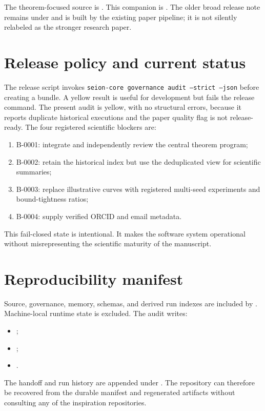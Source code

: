 \documentclass[11pt]{article}
\begin{document}
The theorem-focused source is . This companion is . The older broad release note remains under  and is built by the existing paper pipeline; it is not silently relabeled as the stronger research paper.

\section{Release policy and current status}

The release script invokes \texttt{seion-core governance audit --strict --json} before creating a bundle. A yellow result is useful for development but fails the release command. The present audit is yellow, with no structural errors, because it reports duplicate historical executions and the paper quality flag is not release-ready. The four registered scientific blockers are:
\begin{enumerate}
    \item B-0001: integrate and independently review the central theorem program;
    \item B-0002: retain the historical index but use the deduplicated view for scientific summaries;
    \item B-0003: replace illustrative curves with registered multi-seed experiments and bound-tightness ratios;
    \item B-0004: supply verified ORCID and email metadata.
\end{enumerate}

This fail-closed state is intentional. It makes the software system operational without misrepresenting the scientific maturity of the manuscript.

\section{Reproducibility manifest}

Source, governance, memory, schemas, and derived run indexes are included by . Machine-local runtime state is excluded. The audit writes:
\begin{itemize}
    \item {};
    \item {};
    \item {}.
\end{itemize}
The handoff and run history are appended under . The repository can therefore be recovered from the durable manifest and regenerated artifacts without consulting any of the inspiration repositories.

\small


\end{document}
